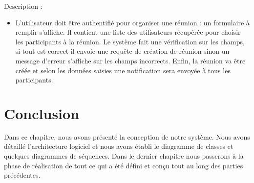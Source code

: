 \par Description : 
\begin{itemize}
    \item 	L’utilisateur doit être authentifié pour organiser une réunion : un formulaire à remplir s'affiche. Il contient une liste des utilisateurs récupérée pour choisir les participants à la réunion. Le système fait une vérification sur les champs, si tout est correct il envoie une requête de création de réunion sinon un message d’erreur s’affiche sur les champs incorrects. Enfin, la réunion va être créée et selon les données saisies une notification sera envoyée à tous les participants.  
\end{itemize}
\section*{	Conclusion}
\hspace{4mm} 
Dans ce chapitre, nous avons présenté la conception de notre système. Nous avons détaillé l’architecture logiciel et nous avons établi le diagramme de classes et quelques diagrammes de séquences. Dans le dernier chapitre nous passerons à la phase de réalisation de tout ce qui a été défini et conçu tout au long des parties précédentes.


